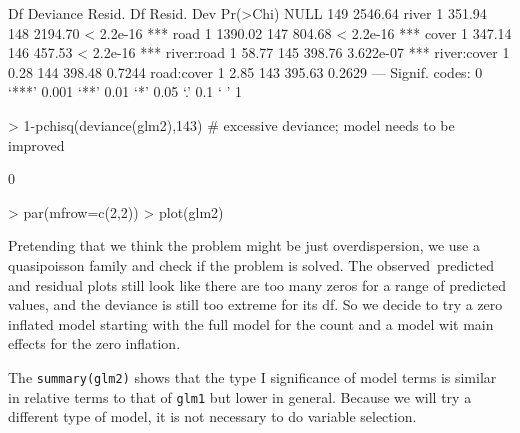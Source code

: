 \documentclass{article}
\begin{document}
\begin{Schunk}
\begin{Soutput}
            Df Deviance Resid. Df Resid. Dev  Pr(>Chi)    
NULL                          149    2546.64              
river        1   351.94       148    2194.70 < 2.2e-16 ***
road         1  1390.02       147     804.68 < 2.2e-16 ***
cover        1   347.14       146     457.53 < 2.2e-16 ***
river:road   1    58.77       145     398.76 3.622e-07 ***
river:cover  1     0.28       144     398.48    0.7244    
road:cover   1     2.85       143     395.63    0.2629    
---
Signif. codes:  0 ‘***’ 0.001 ‘**’ 0.01 ‘*’ 0.05 ‘.’ 0.1 ‘ ’ 1
\end{Soutput}
\begin{Sinput}
> 1-pchisq(deviance(glm2),143) # excessive deviance; model needs to be improved
\end{Sinput}
\begin{Soutput}
[1] 0
\end{Soutput}
\begin{Sinput}
> par(mfrow=c(2,2))
> plot(glm2)
\end{Sinput}
\end{Schunk}

Pretending that we think the problem might be just overdispersion, we use a quasipoisson family and check if the problem is solved. The observed~predicted and residual plots still look like there are too many zeros for a range of predicted values, and the deviance is still too extreme for its df. So we decide to try a zero inflated model starting with the full model for the count and a model wit main effects for the zero inflation.

The \verb!summary(glm2)! shows that the type I significance of model terms is similar in relative terms to that of \verb!glm1! but lower in general. Because we will try a different type of model, it is not necessary to do variable selection.
\end{document}
